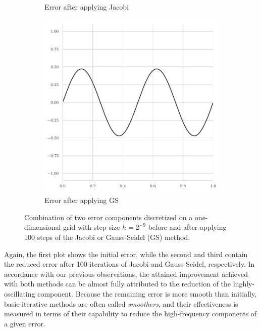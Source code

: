 \begin{figure}
\begin{subfigure}[t]{0.32\textwidth}
		\caption{Error after applying Jacobi}
\end{subfigure}
\begin{subfigure}[t]{0.32\textwidth}
	\centering
	\includegraphics[width=\textwidth]{figures/error_plots//final_error_gauss_seidel_combined.pdf}
	\caption{Error after applying GS}
\end{subfigure}
	\caption[Combination of two error components on a one-dimensional grid with step size $h = 2^{-9}$.]{Combination of two error components discretized on a one-dimensional grid with step size $h = 2^{-9}$ before and after applying 100 steps of the Jacobi or Gauss-Seidel (GS) method.}
\label{fig:combined-error}
\end{figure}
Again, the first plot shows the initial error, while the second and third contain the reduced error after 100 iterations of Jacobi and Gauss-Seidel, respectively.
In accordance with our previous observations, the attained improvement achieved with both methods can be almost fully attributed to the reduction of the highly-oscillating component.
Because the remaining error is more smooth than initially, basic iterative methods are often called \emph{smoothers}, and their effectiveness is measured in terms of their capability to reduce the high-frequency components of a given error. 

